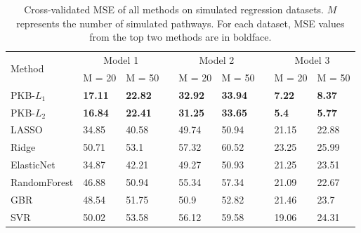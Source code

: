 \documentclass[a4paper,12pt]{article}
\begin{document}
	\begin{table}[htp]
		\centering
		\begin{tabular}{lllllllll}
			\hline
			\multirow{2}{*}{Method} & \multicolumn{2}{c}{Model 1}     &  & \multicolumn{2}{c}{Model 2}     &  & \multicolumn{2}{c}{Model 3}   \\ \cline{2-3} \cline{5-6} \cline{8-9} 
			& M = 20         & M = 50         &  & M = 20         & M = 50         &  & M = 20        & M = 50        \\ \hline
			PKB-$L_1$                  & \textbf{17.11} & \textbf{22.82} &  & \textbf{32.92} & \textbf{33.94} &  & \textbf{7.22} & \textbf{8.37} \\
			PKB-$L_2$                  & \textbf{16.84} & \textbf{22.41} &  & \textbf{31.25} & \textbf{33.65} &  & \textbf{5.4}  & \textbf{5.77} \\
			LASSO                   & 34.85          & 40.58          &  & 49.74          & 50.94          &  & 21.15         & 22.88         \\
			Ridge                   & 50.71          & 53.1           &  & 57.32          & 60.52          &  & 23.25         & 25.99         \\
			ElasticNet              & 34.87          & 42.21          &  & 49.27          & 50.93          &  & 21.25         & 23.51         \\
			RandomForest            & 46.88          & 50.94          &  & 55.34          & 57.34          &  & 21.09         & 22.67         \\
			GBR                     & 48.54          & 51.75          &  & 50.9           & 52.82          &  & 21.46         & 23.7          \\
			SVR                     & 50.02          & 53.58          &  & 56.12          & 59.58          &  & 19.06         & 24.31         \\ \hline
		\end{tabular}
		\caption{Cross-validated MSE of all methods on simulated regression datasets. $M$ represents the number of simulated pathways. For each dataset, MSE values from the top two methods are in boldface.}
		\label{tab:simu_reg}
	\end{table}
\end{document}
